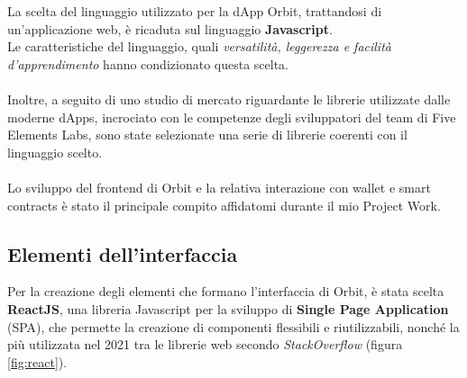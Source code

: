 \documentclass[12pt,a4paper]{report}
\begin{document}
La scelta del linguaggio utilizzato per la dApp Orbit, trattandosi di un'applicazione web, è ricaduta sul linguaggio \textbf{Javascript}\cite{js}.\\Le caratteristiche del linguaggio, quali \textit{versatilità, leggerezza e facilità d'apprendimento} hanno condizionato questa scelta.
\\\\Inoltre, a seguito di uno studio di mercato riguardante le librerie utilizzate dalle moderne dApps, incrociato con le competenze degli sviluppatori del team di Five Elements Labs, sono state selezionate una serie di librerie coerenti con il linguaggio scelto.
\\\\Lo sviluppo del frontend di Orbit e la relativa interazione con wallet e smart contracts è stato il principale compito affidatomi durante il mio Project Work.

\subsection{Elementi dell'interfaccia}

Per la creazione degli elementi che formano l'interfaccia di Orbit, è stata scelta \textbf{ReactJS}\cite{react}, una libreria Javascript per la sviluppo di \textbf{Single Page Application} (SPA\cite{spa}), che permette la creazione di componenti flessibili e riutilizzabili, nonché la più utilizzata nel 2021 tra le librerie web secondo \textit{StackOverflow}\cite{react_2021} (figura \ref{fig:react}).
\end{document}
